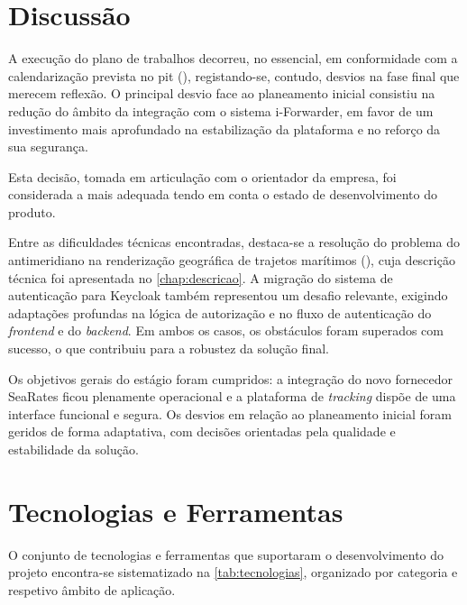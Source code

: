\section{Discussão}

A execução do plano de trabalhos decorreu, no essencial, em conformidade com a calendarização prevista no \gls{pit} (), registando-se, contudo, desvios na fase final que merecem reflexão. O principal desvio face ao planeamento inicial consistiu na redução do âmbito da integração com o sistema i-Forwarder, em favor de um investimento mais aprofundado na estabilização da plataforma e no reforço da sua segurança.

Esta decisão, tomada em articulação com o orientador da empresa, foi considerada a mais adequada tendo em conta o estado de desenvolvimento do produto.

Entre as dificuldades técnicas encontradas, destaca-se a resolução do problema do antimeridiano na renderização geográfica de trajetos marítimos (), cuja descrição técnica foi apresentada no \autoref{chap:descricao}. A migração do sistema de autenticação para Keycloak também representou um desafio relevante, exigindo adaptações profundas na lógica de autorização e no fluxo de autenticação do \textit{frontend} e do \textit{backend}. Em ambos os casos, os obstáculos foram superados com sucesso, o que contribuiu para a robustez da solução final.

Os objetivos gerais do estágio foram cumpridos: a integração do novo fornecedor SeaRates ficou plenamente operacional e a plataforma de \textit{tracking} dispõe de uma interface funcional e segura. Os desvios em relação ao planeamento inicial foram geridos de forma adaptativa, com decisões orientadas pela qualidade e estabilidade da solução.

\section{Tecnologias e Ferramentas}\label{sec:tecnologias}

O conjunto de tecnologias e ferramentas que suportaram o desenvolvimento do projeto encontra-se sistematizado na \autoref{tab:tecnologias}, organizado por categoria e respetivo âmbito de aplicação.

